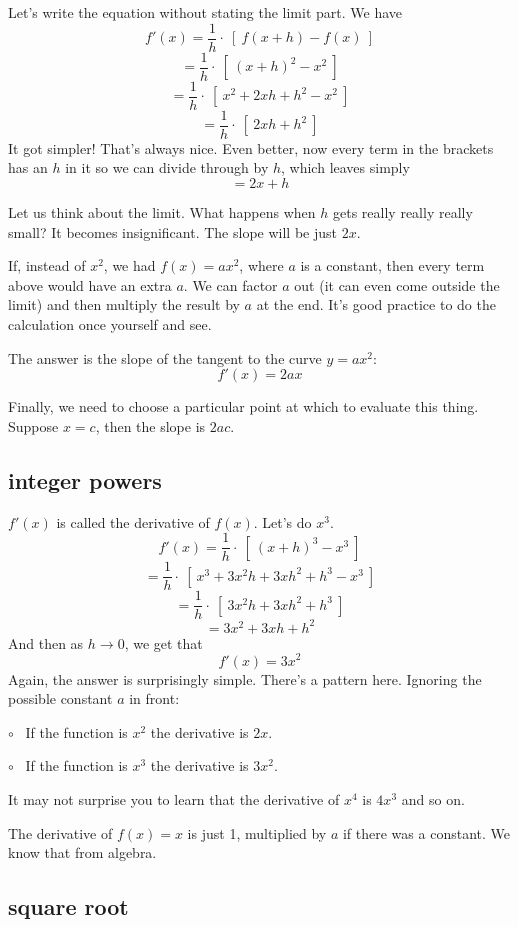 \documentclass[11pt, oneside]{article}
\begin{document}
Let's write the equation without stating the limit part.  We have
\[ f'(x) = \frac{1}{h} \cdot \ [ \ f(x + h) - f(x) \ ] \]
\[ = \frac{1}{h} \cdot \ [ \ (x + h)^2 - x^2 \ ] \]
\[ = \frac{1}{h} \cdot \ [ \ x^2 + 2xh + h^2 - x^2 \ ] \]
\[ = \frac{1}{h} \cdot \ [ \ 2xh + h^2  \ ] \]
It got simpler!  That's always nice.  Even better, now every term in the brackets has an $h$ in it so we can divide through by $h$, which leaves simply
\[ = 2x + h  \]

Let us think about the limit.  What happens when $h$ gets really really really small?  It becomes insignificant.  The slope will be just $2x$.  

If, instead of $x^2$, we had $f(x) = ax^2$, where $a$ is a constant, then every term above would have an extra $a$.  We can factor $a$ out (it can even come outside the limit) and then multiply the result by $a$ at the end.  It's good practice to do the calculation once yourself and see.

The answer is the slope of the tangent to the curve $y = ax^2$:
\[ f'(x) = 2ax \]

Finally, we need to choose a particular point at which to evaluate this thing.  Suppose $x = c$, then the slope is $2ac$.

\subsection*{integer powers}
$f'(x)$ is called the derivative of $f(x)$.  Let's do $x^3$.
\[ f'(x) = \frac{1}{h} \cdot \ [ \ (x + h)^3 - x^3 \ ] \]
\[ = \frac{1}{h} \cdot \ [ \ x^3 + 3x^2h + 3xh^2 + h^3 - x^3 \ ] \]
\[ = \frac{1}{h} \cdot \ [ \ 3x^2h + 3xh^2 + h^3 \ ] \]
\[ = 3x^2 + 3xh + h^2 \]
And then as $h \rightarrow 0$, we get that 
\[ f'(x) = 3x^2 \]
Again, the answer is surprisingly simple.  There's a pattern here.  Ignoring the possible constant $a$ in front:

$\circ$ \ If the function is $x^2$ the derivative is $2x$.

$\circ$ \ If the function is $x^3$ the derivative is $3x^2$.

It may not surprise you to learn that the derivative of $x^4$ is $4x^3$ and so on.  

The derivative of $f(x) = x$ is just 1, multiplied by $a$ if there was a constant.  We know that from algebra.

\subsection*{square root}
\end{document}

